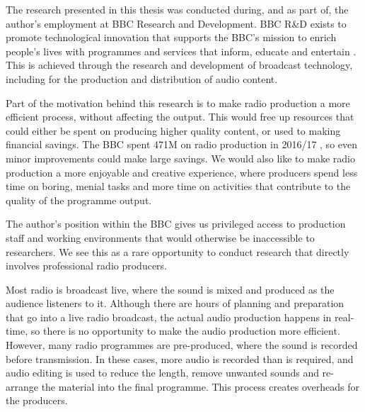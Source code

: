 


The research presented in this thesis was conducted during, and as part of, the author's employment at BBC Research and
Development.  BBC R\&D exists to promote technological innovation that supports the BBC's mission to enrich people's
lives with programmes and services that inform, educate and entertain \citep[art. 15]{BBCCharter2016}.  This is
achieved through the research and development of broadcast technology, including for the production and distribution of
audio content.

Part of the motivation behind this research is to make radio production a more efficient process, without affecting the
output. This would free up resources that could either be spent on producing higher quality content, or used to making
financial savings. The BBC spent \textsterling471M on radio production in 2016/17 \citep[p. 111]{Ofcom2017}, so even
minor improvements could make large savings.  We would also like to make radio production a more enjoyable and creative
experience, where producers spend less time on boring, menial tasks and more time on activities that contribute to the
quality of the programme output.

The author's position within the BBC gives us privileged access to production staff and working environments that would
otherwise be inaccessible to researchers. We see this as a rare opportunity to conduct research that directly involves
professional radio producers.

Most radio is broadcast live, where the sound is mixed and produced as the audience listeners to it.  Although there
are hours of planning and preparation that go into a live radio broadcast, the actual audio production happens in
real-time, so there is no opportunity to make the audio production more efficient.  However, many radio programmes are
pre-produced, where the sound is recorded before transmission.  In these cases, more audio is recorded than is
required, and audio editing is used to reduce the length, remove unwanted sounds and re-arrange the material into the
final programme. This process creates overheads for the producers.

